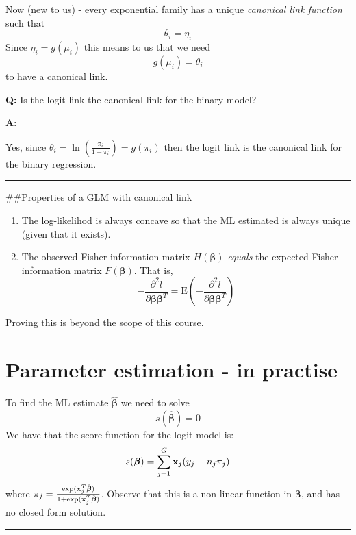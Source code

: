 \documentclass[
]{article}
\begin{document}
Now (new to us) - every exponential family has a unique \emph{canonical
link function} such that \[\theta_i=\eta_i\] Since \(\eta_i=g(\mu_i)\)
this means to us that we need \[ g(\mu_i)=\theta_i\] to have a canonical
link.

\textbf{Q:} Is the logit link the canonical link for the binary model?

\textbf{A}:

Yes, since \(\theta_i=\ln( \frac{\pi_i}{1-\pi_i})=g(\pi_i)\) then the
logit link is the canonical link for the binary regression.

\begin{center}\rule{0.5\linewidth}{0.5pt}\end{center}

\#\#Properties of a GLM with canonical link

\begin{enumerate}
\def\labelenumi{\arabic{enumi}.}
\item
  The log-likelihod is always concave so that the ML estimated is always
  unique (given that it exists).
\item
  The observed Fisher information matrix \(H(\boldsymbol{\beta})\)
  \emph{equals} the expected Fisher information matrix
  \(F(\boldsymbol{\beta})\). That is,
  \[-\frac{\partial^2 l}{\partial \boldsymbol{\beta} \boldsymbol{\beta}^T}=\text{E}(-\frac{\partial^2 l}{\partial \boldsymbol{\beta} \boldsymbol{\beta}^T})\]
\end{enumerate}

Proving this is beyond the scope of this course.

\hypertarget{parameter-estimation---in-practise}{%
\section{Parameter estimation - in
practise}\label{parameter-estimation---in-practise}}

To find the ML estimate \(\hat{\boldsymbol{\beta}}\) we need to solve
\[s(\hat{\boldsymbol{\beta}})=0\] We have that the score function for
the logit model is:
\[s(\boldsymbol{\beta})=\sum_{j=1}^G {\bf x}_j (y_j-n_j\pi_j)\] where
\(\pi_j=\frac{\exp({\bf x}_j^T\hat{\boldsymbol{\beta}})}{1+\exp({\bf x}_j^T\hat{\boldsymbol{\beta}})}\).
Observe that this is a non-linear function in \(\boldsymbol{\beta}\),
and has no closed form solution.

\begin{center}\rule{0.5\linewidth}{0.5pt}\end{center}
\end{document}
